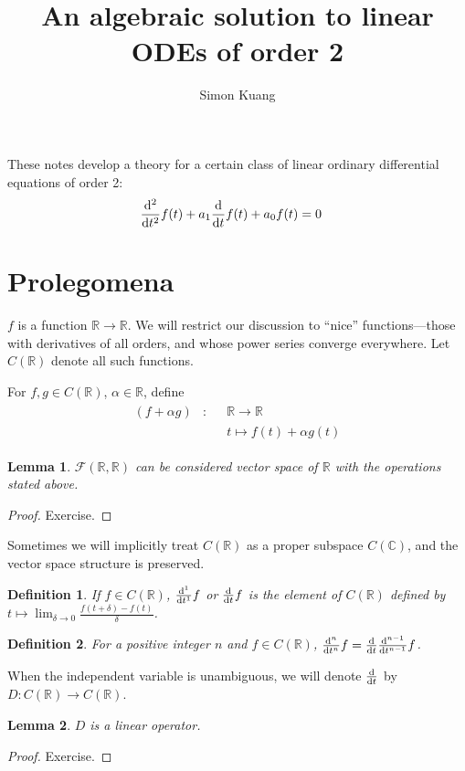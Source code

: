 \documentclass[oneside]{memoir}
\newtheorem{definition}{Definition}
\newtheorem{lemma}{Lemma}
\begin{document}
	\title{An algebraic solution to linear ODEs of order 2}
	\author{Simon Kuang}
	\maketitle
	These notes develop a theory for a certain class of linear ordinary differential equations of order 2:
	\begin{align*}
		\derivative[2]{}{t} f(t) + a_1\derivative{}{t} f(t) + a_0 f(t) &= 0
	\end{align*}
	
	\section{Prolegomena}
	\def\realfunctions{\ensuremath{C(\mathbb{R})}}
	\(f\) is a function \(\mathbb{R}\to \mathbb{R}\).
	We will restrict our discussion to ``nice'' functions---those with derivatives of all orders, and whose power series converge everywhere.
	Let \(\realfunctions\) denote all such functions.
	
	For \(f, g \in \realfunctions\), \(\alpha \in \mathbb{R}\), define
	\begin{align*}
		\begin{aligned}
			\left(f + \alpha g\right) &: &&\mathbb{R} \to \mathbb{R} \\
									  &\phantom{{}:{}} && t \mapsto f(t) + \alpha g(t)
		\end{aligned}
	\end{align*}
	
	\begin{lemma}
		\(\mathcal{F}(\mathbb{R}, \mathbb{R})\) can be considered vector space of \(\mathbb{R}\) with the operations stated above.
	\end{lemma}
	\begin{proof}
		Exercise.
	\end{proof}
	
	Sometimes we will implicitly treat \(\realfunctions\) as a proper subspace \(C(\mathbb{C})\), and the vector space structure is preserved.
	
	\begin{definition}
		If \(f\in \realfunctions\), \(\derivative[1]{}{t}f\) or \(\derivative{}{t}f\) is the element of \(\realfunctions\) defined by \(t \mapsto \lim_{\delta\to 0}\frac{f(t + \delta) - f(t)}{\delta}\).
	\end{definition}
	\begin{definition}
		For a positive integer \(n\) and \(f\in\realfunctions\), \(\derivative[n]{}{t} f = \derivative{}{t} \derivative[n - 1]{}{t} f\).
	\end{definition}
	When the independent variable is unambiguous, we will denote \(\derivative{}{t}\) by \(D:\realfunctions\to\realfunctions\).
	\begin{lemma}
		\(D\) is a linear operator.
	\end{lemma}
	\begin{proof}
		Exercise.
	\end{proof}
	
\end{document}
